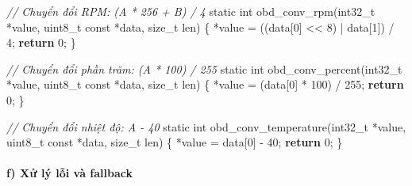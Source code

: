\documentclass[13pt,a4paper]{extarticle}
\newenvironment{Shaded}{}{}
\newcommand{\CommentTok}[1]{\textcolor[rgb]{0.38,0.63,0.69}{\textit{#1}}}
\newcommand{\ControlFlowTok}[1]{\textcolor[rgb]{0.00,0.44,0.13}{\textbf{#1}}}
\newcommand{\DataTypeTok}[1]{\textcolor[rgb]{0.56,0.13,0.00}{#1}}
\newcommand{\DecValTok}[1]{\textcolor[rgb]{0.25,0.63,0.44}{#1}}
\newcommand{\NormalTok}[1]{#1}
\newcommand{\OperatorTok}[1]{\textcolor[rgb]{0.40,0.40,0.40}{#1}}
\renewcommand{\\}{\thesislongtableorignewline\hline}%
\begin{document}
\begin{Shaded}
\begin{Highlighting}[]
\CommentTok{// Chuyển đổi RPM: (A * 256 + B) / 4}
\DataTypeTok{static} \DataTypeTok{int}\NormalTok{ obd\_conv\_rpm}\OperatorTok{(}\DataTypeTok{int32\_t} \OperatorTok{*}\NormalTok{value}\OperatorTok{,} \DataTypeTok{uint8\_t} \DataTypeTok{const} \OperatorTok{*}\NormalTok{data}\OperatorTok{,} \DataTypeTok{size\_t}\NormalTok{ len}\OperatorTok{)}
\OperatorTok{\{}
    \OperatorTok{*}\NormalTok{value }\OperatorTok{=} \OperatorTok{((}\NormalTok{data}\OperatorTok{[}\DecValTok{0}\OperatorTok{]} \OperatorTok{\textless{}\textless{}} \DecValTok{8}\OperatorTok{)} \OperatorTok{|}\NormalTok{ data}\OperatorTok{[}\DecValTok{1}\OperatorTok{])} \OperatorTok{/} \DecValTok{4}\OperatorTok{;}
    \ControlFlowTok{return} \DecValTok{0}\OperatorTok{;}
\OperatorTok{\}}

\CommentTok{// Chuyển đổi phần trăm: (A * 100) / 255}
\DataTypeTok{static} \DataTypeTok{int}\NormalTok{ obd\_conv\_percent}\OperatorTok{(}\DataTypeTok{int32\_t} \OperatorTok{*}\NormalTok{value}\OperatorTok{,} \DataTypeTok{uint8\_t} \DataTypeTok{const} \OperatorTok{*}\NormalTok{data}\OperatorTok{,} \DataTypeTok{size\_t}\NormalTok{ len}\OperatorTok{)}
\OperatorTok{\{}
    \OperatorTok{*}\NormalTok{value }\OperatorTok{=} \OperatorTok{(}\NormalTok{data}\OperatorTok{[}\DecValTok{0}\OperatorTok{]} \OperatorTok{*} \DecValTok{100}\OperatorTok{)} \OperatorTok{/} \DecValTok{255}\OperatorTok{;}
    \ControlFlowTok{return} \DecValTok{0}\OperatorTok{;}
\OperatorTok{\}}

\CommentTok{// Chuyển đổi nhiệt độ: A {-} 40}
\DataTypeTok{static} \DataTypeTok{int}\NormalTok{ obd\_conv\_temperature}\OperatorTok{(}\DataTypeTok{int32\_t} \OperatorTok{*}\NormalTok{value}\OperatorTok{,} \DataTypeTok{uint8\_t} \DataTypeTok{const} \OperatorTok{*}\NormalTok{data}\OperatorTok{,} \DataTypeTok{size\_t}\NormalTok{ len}\OperatorTok{)}
\OperatorTok{\{}
    \OperatorTok{*}\NormalTok{value }\OperatorTok{=}\NormalTok{ data}\OperatorTok{[}\DecValTok{0}\OperatorTok{]} \OperatorTok{{-}} \DecValTok{40}\OperatorTok{;}
    \ControlFlowTok{return} \DecValTok{0}\OperatorTok{;}
\OperatorTok{\}}
\end{Highlighting}
\end{Shaded}

\paragraph{f) Xử lý lỗi và
fallback}\label{f-xux1eed-luxfd-lux1ed7i-vuxe0-fallback}
\end{document}
